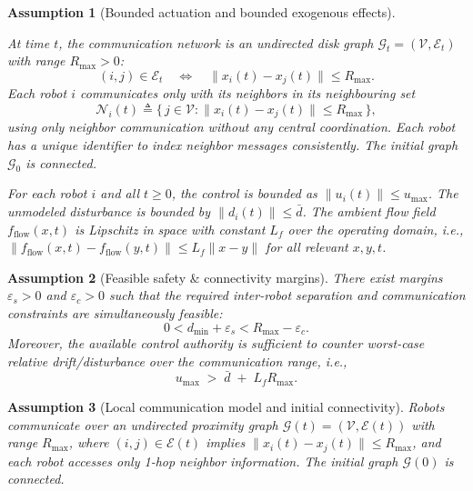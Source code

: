 \documentclass[conference]{IEEEconf}
\theoremstyle{plain}
\newtheorem{assumption}{Assumption}
\begin{document}
\begin{assumption}[Bounded actuation and bounded exogenous effects]
\label{ass:A1}

At time $t$, the communication network is an undirected disk graph $\mathcal{G}_t=(\mathcal{V},\mathcal{E}_t)$ with range $R_{\max}>0$:
\begin{equation}
(i,j)\in\mathcal{E}_t \quad \Longleftrightarrow \quad \|x_i(t)-x_j(t)\|\le R_{\max}.
\label{eq:disk_graph}
\end{equation}
Each robot $i$ communicates only with its neighbors in its neighbouring set
\begin{equation}
\mathcal{N}_i(t) \triangleq \{\, j\in\mathcal{V} : \|x_i(t)-x_j(t)\|\le R_{\max}\,\},
\label{eq:neighbors}
\end{equation}
using only neighbor communication without any central coordination. Each robot has a unique identifier to index neighbor messages consistently. The initial graph $\mathcal{G}_0$ is connected.

For each robot $i$ and all $t\ge 0$, the control is bounded as $\|u_i(t)\|\le u_{\max}$.
The unmodeled disturbance is bounded by $\|d_i(t)\|\le \bar d$.
The ambient flow field $f_{\mathrm{flow}}(x,t)$ is Lipschitz in space with constant $L_f$ over the operating domain, i.e.,
$\|f_{\mathrm{flow}}(x,t)-f_{\mathrm{flow}}(y,t)\|\le L_f\|x-y\|$ for all relevant $x,y,t$.
\end{assumption}

\begin{assumption}[Feasible safety \& connectivity margins]
\label{ass:A2}
There exist margins $\varepsilon_s>0$ and $\varepsilon_c>0$ such that the required inter-robot separation and
communication constraints are simultaneously feasible:
\[
0<d_{\min}+\varepsilon_s < R_{\max}-\varepsilon_c.
\]
Moreover, the available control authority is sufficient to counter worst-case relative drift/disturbance over the
communication range, i.e.,
\[
u_{\max} \;>\; \bar d \;+\; L_f R_{\max}.
\]
\end{assumption}

\begin{assumption}[Local communication model and initial connectivity]
\label{ass:A3}
Robots communicate over an undirected proximity graph $\mathcal{G}(t)=(\mathcal{V},\mathcal{E}(t))$ with range $R_{\max}$,
where $(i,j)\in\mathcal{E}(t)$ implies $\|x_i(t)-x_j(t)\|\le R_{\max}$, and each robot accesses only 1-hop neighbor
information. The initial graph $\mathcal{G}(0)$ is connected.
\end{assumption}
\end{document}
